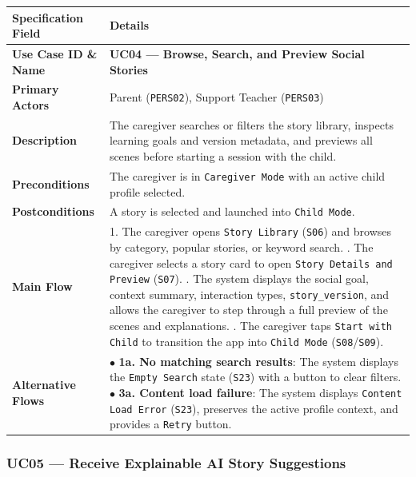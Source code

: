 \noindent\begin{xltabular}{\textwidth}{|p{4.0cm}|X|}
\hline
\textbf{Specification Field} & \textbf{Details} \\ \hline
\endhead
\textbf{Use Case ID \& Name} & \textbf{UC04 — Browse, Search, and Preview Social Stories} \\ \hline
\textbf{Primary Actors} & Parent (\texttt{PERS02}), Support Teacher (\texttt{PERS03}) \\ \hline
\textbf{Description} & The caregiver searches or filters the story library, inspects learning goals and version metadata, and previews all scenes before starting a session with the child. \\ \hline
\textbf{Preconditions} & The caregiver is in \texttt{Caregiver Mode} with an active child profile selected. \\ \hline
\textbf{Postconditions} & A story is selected and launched into \texttt{Child Mode}. \\ \hline
\textbf{Main Flow} & 1. The caregiver opens \texttt{Story Library} (\texttt{S06}) and browses by category, popular stories, or keyword search. . The caregiver selects a story card to open \texttt{Story Details and Preview} (\texttt{S07}). . The system displays the social goal, context summary, interaction types, \texttt{story\_version}, and allows the caregiver to step through a full preview of the scenes and explanations. . The caregiver taps \texttt{Start with Child} to transition the app into \texttt{Child Mode} (\texttt{S08}/\texttt{S09}). \\ \hline
\textbf{Alternative Flows} & $\bullet$ \textbf{1a. No matching search results}: The system displays the \texttt{Empty Search} state (\texttt{S23}) with a button to clear filters. \newline $\bullet$ \textbf{3a. Content load failure}: The system displays \texttt{Content Load Error} (\texttt{S23}), preserves the active profile context, and provides a \texttt{Retry} button. \\ \hline
\end{xltabular}



\subsubsection{UC05 — Receive Explainable AI Story Suggestions}


